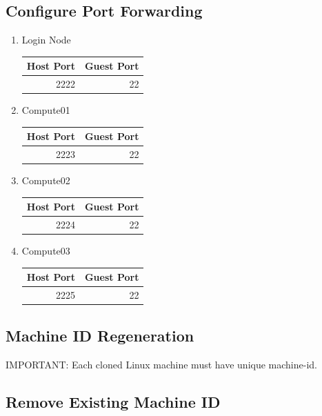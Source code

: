 \documentclass[11pt]{article}
\begin{document}
\subsection{Configure Port Forwarding}
\label{sec:orgaff49bc}
\begin{enumerate}
\item Login Node
\label{sec:org1eb8c68}

\begin{center}
\begin{tabular}{rr}
Host Port & Guest Port\\
\hline
2222 & 22\\
\end{tabular}
\end{center}
\item Compute01
\label{sec:orgdbecab1}

\begin{center}
\begin{tabular}{rr}
Host Port & Guest Port\\
\hline
2223 & 22\\
\end{tabular}
\end{center}
\item Compute02
\label{sec:org6338d67}

\begin{center}
\begin{tabular}{rr}
Host Port & Guest Port\\
\hline
2224 & 22\\
\end{tabular}
\end{center}
\item Compute03
\label{sec:org8a05559}

\begin{center}
\begin{tabular}{rr}
Host Port & Guest Port\\
\hline
2225 & 22\\
\end{tabular}
\end{center}
\end{enumerate}
\subsection{Machine ID Regeneration}
\label{sec:org6821856}

IMPORTANT:
Each cloned Linux machine must have unique machine-id.
\subsection{Remove Existing Machine ID}
\label{sec:orgda06d13}
\end{document}
